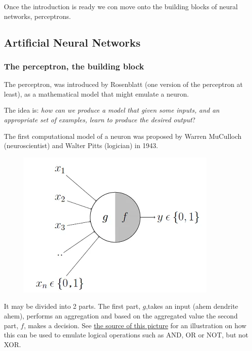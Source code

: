 \documentclass[
  letterpaper,
  DIV=11,
  numbers=noendperiod,
  oneside]{scrartcl}
\begin{document}
Once the introduction is ready we con move onto the building blocks of
neural networks, perceptrons.

\hypertarget{artificial-neural-networks}{%
\subsection{Artificial Neural
Networks}\label{artificial-neural-networks}}

\hypertarget{the-perceptron-the-building-block}{%
\subsubsection{The perceptron, the building
block}\label{the-perceptron-the-building-block}}

The perceptron, was introduced by Rosenblatt (one version of the
perceptron at least), as a mathematical model that might emulate a
neuron.

The idea is: \emph{how can we produce a model that given some inputs,
and an appropriate set of examples, learn to produce the desired
output}?

The first computational model of a neuron was proposed by Warren
MuCulloch (neuroscientist) and Walter Pitts (logician) in 1943.

\begin{figure}

{\centering 

\href{https://towardsdatascience.com/mcculloch-pitts-model-5fdf65ac5dd1}{\includegraphics{images/MacCulloghPitts-Neuron.png}}

}

\end{figure}

It may be divided into 2 parts. The first part, \(g\),takes an input
(ahem dendrite ahem), performs an aggregation and based on the
aggregated value the second part, \(f\), makes a decision. See
\href{https://towardsdatascience.com/mcculloch-pitts-model-5fdf65ac5dd1}{the
source of this picture} for an illustration on how this can be used to
emulate logical operations such as AND, OR or NOT, but not XOR.
\end{document}

